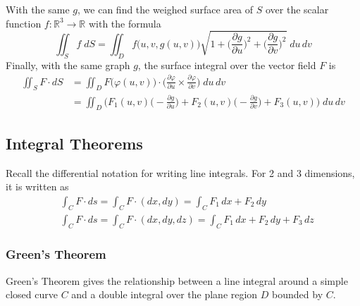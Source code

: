 \documentclass{article}
\theoremstyle{remark}
\theoremstyle{definition}
\begin{document}
With the same $g$, we can find the weighed surface area of $S$ over the scalar function $f: \mathbb{R}^3 \longrightarrow \mathbb{R}$ with the formula
\[\iint_S f \; d S = \iint_D f\big(u, v, g(u, v)\big) \sqrt{1 + \Big(\frac{\partial g}{\partial u}\Big)^2 + \Big( \frac{\partial g}{\partial v}\Big)^2} \; d u \, d v\]
Finally, with the same graph $g$, the surface integral over the vector field $F$ is
\begin{align*}
    \iint_S F \cdot d S & = \iint_D F\big(\varphi(u, v)\big) \cdot \bigg( \frac{\partial \varphi}{\partial u} \times \frac{\partial \varphi}{\partial v}\bigg) \; d u \, d v \\
    & = \iint_D \bigg( F_1(u, v) \Big(- \frac{\partial g}{\partial u}\Big) + F_2 (u, v) \Big( - \frac{\partial g}{\partial v} \Big) + F_3 (u, v) \bigg) \; d u \, d v
\end{align*}

\subsection{Integral Theorems}
Recall the differential notation for writing line integrals. For 2 and 3 dimensions, it is written as
\begin{align*}
    & \int_C F \cdot d s = \int_C F \cdot (d x, d y) = \int_C F_1 \, d x + F_2 \, d y \\
    & \int_C F \cdot d s = \int_C F \cdot (d x, d y, d z) = \int_C F_1 \, d x + F_2 \, d y + F_3 \, d z 
\end{align*}
\subsubsection{Green's Theorem}
Green's Theorem gives the relationship between a line integral around a simple closed curve $C$ and a double integral over the plane region $D$ bounded by $C$. 
\end{document}
